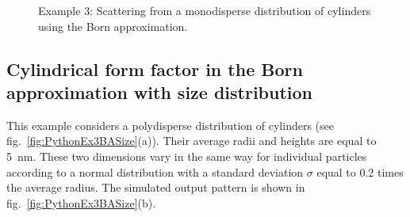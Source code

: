 \begin{figure}[H]
\hfill
{}
\hfill
{}
\hfill
\caption{Example 3: Scattering from a monodisperse distribution of cylinders using the Born approximation.}
\label{fig:PythonEx3BA}
\end{figure}

\subsection{Cylindrical form factor in the Born approximation with size distribution}
This example considers a polydisperse distribution of cylinders (see fig.~\ref{fig:PythonEx3BASize}(a)). Their average radii and heights are equal to 5~nm. These two dimensions vary in the same way for individual particles according to a normal distribution with a standard deviation $\sigma$ equal to 0.2 times the average radius. The simulated output pattern is shown in fig.~\ref{fig:PythonEx3BASize}(b).

